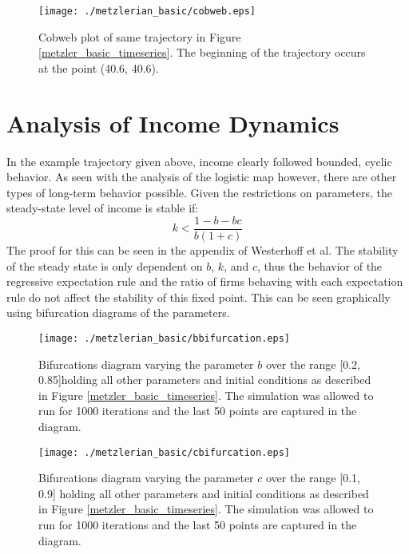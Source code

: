 \begin{figure}
    \centering
    \texttt{[image: ./metzlerian\_basic/cobweb.eps]}
    \caption{Cobweb plot of same trajectory in Figure \ref{metzler_basic_timeseries}. The beginning of the trajectory occurs at the point (40.6, 40.6).}
    \label{metzler_basic_cobweb}
\end{figure}

\section{Analysis of Income Dynamics}
In the example trajectory given above, income clearly followed bounded, cyclic behavior. As seen with the analysis of the logistic map however, there are other types of long-term behavior possible. Given the restrictions on parameters, the steady-state level of income is stable if:
\begin{equation}
    k<\frac{1-b-bc}{b(1+c)}
\end{equation}
The proof for this can be seen in the appendix of Westerhoff et al.\autocite{Wegener2009} The stability of the steady state is only dependent on $b$, $k$, and $c$, thus the behavior of the regressive expectation rule and the ratio of firms behaving with each expectation rule do not affect the stability of this fixed point. This can be seen graphically using bifurcation diagrams of the parameters.

\begin{figure}
    \centering
    \texttt{[image: ./metzlerian\_basic/bbifurcation.eps]}
    \caption{Bifurcations diagram varying the parameter $b$ over the range [0.2, 0.85]holding all other parameters and initial conditions as described in Figure \ref{metzler_basic_timeseries}. The simulation was allowed to run for 1000 iterations and the last 50 points are captured in the diagram.}
    \label{metzler_basic_bbifurcation}
\end{figure} 

\begin{figure}
    \centering
    \texttt{[image: ./metzlerian\_basic/cbifurcation.eps]}
    \caption{Bifurcations diagram varying the parameter $c$ over the range [0.1, 0.9] holding all other parameters and initial conditions as described in Figure \ref{metzler_basic_timeseries}. The simulation was allowed to run for 1000 iterations and the last 50 points are captured in the diagram.}
    \label{metzler_basic_cbifurcation}
\end{figure} 

